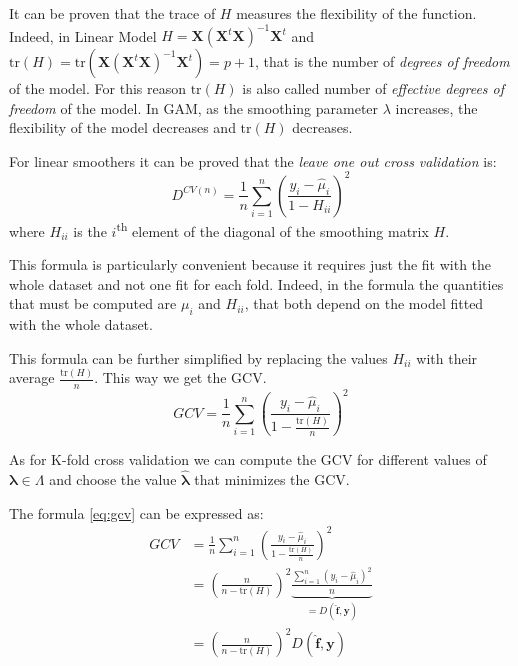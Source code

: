 \documentclass[a4paper, nobind]{templates/ociamthesis}
\theoremstyle{definition}
\theoremstyle{definition}
\theoremstyle{definition}
\theoremstyle{remark}
\begin{document}
It can be proven that the trace of \(H\) measures the flexibility of the function. Indeed, in Linear Model \(H = \boldsymbol{X} \left( \boldsymbol{X}^t\boldsymbol{X} \right)^{-1}\boldsymbol{X}^t\) and \(\text{tr}(H) = \text{tr}\left( \boldsymbol{X} \left( \boldsymbol{X}^t\boldsymbol{X} \right)^{-1}\boldsymbol{X}^t \right) = p + 1\), that is the number of \emph{degrees of freedom} of the model. For this reason \(\text{tr}(H)\) is also called number of \emph{effective degrees of freedom} of the model. In GAM, as the smoothing parameter \(\lambda\) increases, the flexibility of the model decreases and \(\text{tr}(H)\) decreases.

For linear smoothers it can be proved that the \emph{leave one out cross validation} is:
\[
D^{CV(n)} = \frac{1}{n} \sum_{i=1}^{n}{\left( \frac{y_i - \hat{\mu}_i}{1 - H_{ii}} \right)^2}
\]
where \(H_{ii}\) is the \(i\)\textsuperscript{th} element of the diagonal of the smoothing matrix \(H\).

This formula is particularly convenient because it requires just the fit with the whole dataset and not one fit for each fold. Indeed, in the formula the quantities that must be computed are \(\mu_i\) and \(H_{ii}\), that both depend on the model fitted with the whole dataset.

This formula can be further simplified by replacing the values \(H_{ii}\) with their average \(\frac{\text{tr}(H)}{n}\). This way we get the GCV.
\begin{equation}
\label{eq:gcv}
GCV = \frac{1}{n} \sum_{i=1}^{n}{\left( \frac{y_i - \hat{\mu}_i}{1 - \frac{\text{tr}(H)}{n}} \right)^2}
\end{equation}

As for K-fold cross validation we can compute the GCV for different values of \(\boldsymbol{\lambda} \in \Lambda\) and choose the value \(\boldsymbol{\hat{\lambda}}\) that minimizes the GCV.

The formula \eqref{eq:gcv} can be expressed as:
\begin{align}
\nonumber
GCV & = \frac{1}{n} \sum_{i=1}^{n}{\left( \frac{y_i - \hat{\mu}_i}{1 - \frac{\text{tr}(H)}{n}} \right)^2} \\
\nonumber
& = \left( \frac{n}{n - \text{tr}(H)} \right)^2 \underbrace{\frac{\sum_{i=1}^{n}{\left( y_i - \hat{\mu}_i \right)^2}}{n}}_{=D(\boldsymbol{\hat{f}},\boldsymbol{y})} \\
\label{eq:gcv-gam}
& = \left( \frac{n}{n - \text{tr}(H)} \right)^2 D(\boldsymbol{\hat{f}},\boldsymbol{y})
\end{align}
\end{document}
